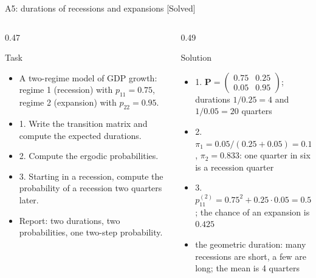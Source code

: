 \begin{frame}{A5: durations of recessions and expansions [Solved]}
\itemsize{\scriptsize}
\begin{columns}[T]
\begin{column}{0.47\textwidth}
\begin{block}{Task}
\begin{itemize}
    \item A two-regime model of GDP growth: regime 1 (recession) with $p_{11} = 0.75$, regime 2 (expansion) with $p_{22} = 0.95$.
    \item 1. Write the transition matrix and compute the expected durations.
    \item 2. Compute the ergodic probabilities.
    \item 3. Starting in a recession, compute the probability of a recession two quarters later.
    \item Report: two durations, two probabilities, one two-step probability.
\end{itemize}
\end{block}
\end{column}
\begin{column}{0.49\textwidth}
\begin{exampleblock}{Solution}
\begin{itemize}
    \item 1. $\mathbf{P} = \begin{pmatrix}0.75 & 0.25\\ 0.05 & 0.95\end{pmatrix}$; durations $1/0.25 = 4$ and $1/0.05 = 20$ quarters
    \item 2. $\pi_1 = 0.05/(0.25 + 0.05) = 0.167$, $\pi_2 = 0.833$: one quarter in six is a recession quarter
    \item 3. $p^{(2)}_{11} = 0.75^2 + 0.25 \cdot 0.05 = 0.575$; the chance of an expansion is $0.425$
    \item the geometric duration: many recessions are short, a few are long; the mean is 4 quarters
\end{itemize}
\end{exampleblock}
\end{column}
\end{columns}
\end{frame}

